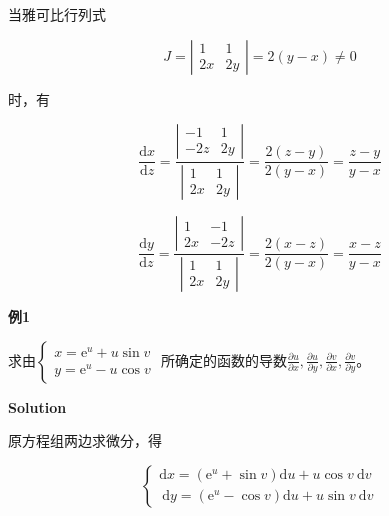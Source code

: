 \documentclass[12pt, a4paper]{article}
\numberwithin{equation}{section}
\newcommand{\rmd}{\mathrm{d}}
\newcommand{\deriv}[2]{\frac{\rmd #1}{\rmd #2}}
\begin{document}
    当雅可比行列式

    $$
        J=\left|\begin{array}{cc}
            1 & 1 \\
            2 x & 2 y
        \end{array}\right|=2(y-x) \neq 0
    $$

    时，有

    $$
        \deriv{x}{z}=\frac{\left|\begin{array}{cc}
        -1 & 1 \\
        -2 z & 2 y
        \end{array}\right|}{\left|\begin{array}{cc}
        1 & 1 \\
        2 x & 2 y
        \end{array}\right|}=\frac{2(z-y)}{2(y-x)}=\frac{z-y}{y-x}
    $$

    $$
        \deriv{y}{z}=\frac{\left|\begin{array}{cc}
        1 & -1 \\
        2 x & -2 z
        \end{array}\right|}{\left|\begin{array}{cc}
        1 & 1 \\
        2 x & 2 y
        \end{array}\right|}=\frac{2(x-z)}{2(y-x)}=\frac{x-z}{y-x}
    $$

    \textbf{例1}
    \vspace{1em}

    求由$\left\{\begin{array}{l}x=\mathrm{e}^u+u \sin v \\ y=\mathrm{e}^u-u \cos v\end{array}\right.$
    所确定的函数的导数$\frac{\partial u}{\partial x}, \frac{\partial u}{\partial y},
    \frac{\partial v}{\partial x}, \frac{\partial v}{\partial y}$。
    \vspace{1em}

    \textbf{Solution}
    \vspace{1em}

    原方程组两边求微分，得

    $$
        \left\{\begin{array}{l}
            \mathrm{d} x=\left(\mathrm{e}^u+\sin v\right) \mathrm{d} u+u \cos v \mathrm{~d} v \\
            \mathrm{~d} y=\left(\mathrm{e}^u-\cos v\right) \mathrm{d} u+u \sin v \mathrm{~d} v
        \end{array}\right.
    $$
\end{document}
